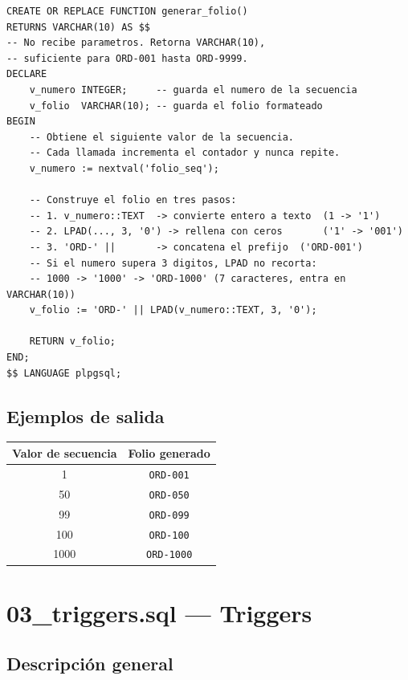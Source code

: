 \documentclass[12pt, a4paper]{article}
\begin{document}
\begin{lstlisting}[caption={Funci\'on generar\_folio()}]
CREATE OR REPLACE FUNCTION generar_folio()
RETURNS VARCHAR(10) AS $$
-- No recibe parametros. Retorna VARCHAR(10),
-- suficiente para ORD-001 hasta ORD-9999.
DECLARE
    v_numero INTEGER;     -- guarda el numero de la secuencia
    v_folio  VARCHAR(10); -- guarda el folio formateado
BEGIN
    -- Obtiene el siguiente valor de la secuencia.
    -- Cada llamada incrementa el contador y nunca repite.
    v_numero := nextval('folio_seq');

    -- Construye el folio en tres pasos:
    -- 1. v_numero::TEXT  -> convierte entero a texto  (1 -> '1')
    -- 2. LPAD(..., 3, '0') -> rellena con ceros       ('1' -> '001')
    -- 3. 'ORD-' ||       -> concatena el prefijo  ('ORD-001')
    -- Si el numero supera 3 digitos, LPAD no recorta:
    -- 1000 -> '1000' -> 'ORD-1000' (7 caracteres, entra en VARCHAR(10))
    v_folio := 'ORD-' || LPAD(v_numero::TEXT, 3, '0');

    RETURN v_folio;
END;
$$ LANGUAGE plpgsql;
\end{lstlisting}

\subsection{Ejemplos de salida}

\begin{center}
\begin{tabular}{cc}
    \toprule
    \textbf{Valor de secuencia} & \textbf{Folio generado} \\
    \midrule
    1    & \texttt{ORD-001}  \\
    50   & \texttt{ORD-050}  \\
    99   & \texttt{ORD-099}  \\
    100  & \texttt{ORD-100}  \\
    1000 & \texttt{ORD-1000} \\
    \bottomrule
\end{tabular}
\end{center}

\section{03\_triggers.sql --- Triggers}

\subsection{Descripci\'on general}
\end{document}
